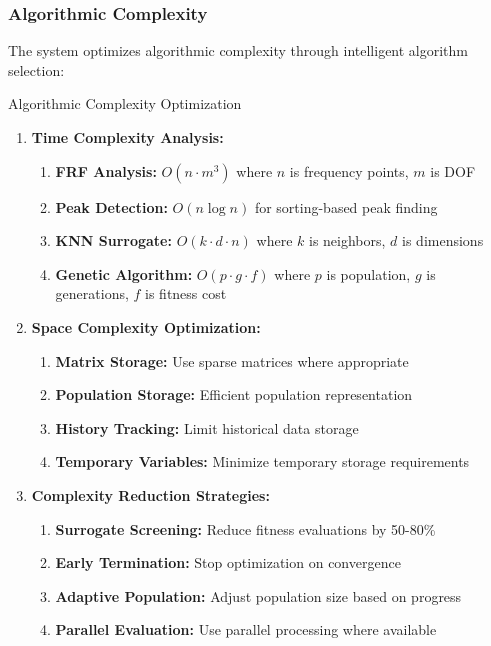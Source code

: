 \documentclass[12pt,a4paper]{article}
\begin{document}
\subsubsection{Algorithmic Complexity}

The system optimizes algorithmic complexity through intelligent algorithm selection:

\begin{algorithm}
\caption{Algorithmic Complexity Optimization}
\begin{enumerate}
    \item \textbf{Time Complexity Analysis:}
    \begin{enumerate}
        \item \textbf{FRF Analysis:} $O(n \cdot m^3)$ where $n$ is frequency points, $m$ is DOF
        \item \textbf{Peak Detection:} $O(n \log n)$ for sorting-based peak finding
        \item \textbf{KNN Surrogate:} $O(k \cdot d \cdot n)$ where $k$ is neighbors, $d$ is dimensions
        \item \textbf{Genetic Algorithm:} $O(p \cdot g \cdot f)$ where $p$ is population, $g$ is generations, $f$ is fitness cost
    \end{enumerate}
    \item \textbf{Space Complexity Optimization:}
    \begin{enumerate}
        \item \textbf{Matrix Storage:} Use sparse matrices where appropriate
        \item \textbf{Population Storage:} Efficient population representation
        \item \textbf{History Tracking:} Limit historical data storage
        \item \textbf{Temporary Variables:} Minimize temporary storage requirements
    \end{enumerate}
    \item \textbf{Complexity Reduction Strategies:}
    \begin{enumerate}
        \item \textbf{Surrogate Screening:} Reduce fitness evaluations by 50-80\%
        \item \textbf{Early Termination:} Stop optimization on convergence
        \item \textbf{Adaptive Population:} Adjust population size based on progress
        \item \textbf{Parallel Evaluation:} Use parallel processing where available
    \end{enumerate}
\end{enumerate}
\end{algorithm}
\end{document}
